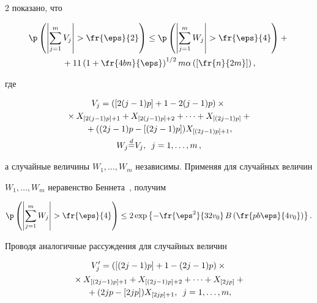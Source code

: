 \begin{multicols}{2}
показано, что

\begin{multline*}

\p \left(\left|\sum\limits_{j=1}^m V_j\right| > \fr{\eps}{2} \right) \leq 

\p \left(\left|\sum\limits_{j=1}^m W_j\right| > \fr{\eps}{4}\right) + {}\\

{}+

11\left(1+\fr{4bn}{\eps}\right)^{1/2} m 

\alpha\left(\left[\fr{n}{2m}\right]\right),

\end{multline*}

где

\begin{multline*}

V_j = ([2(j-1)p]+1-2(j-1)p)\times{}\\

{}\times X_{[2(j-1)p]+1}+X_{[2(j-1)p]+2}+\cdots + X_{[(2j-1)p]} + {}\\

{}+((2j-1)p-[(2j-1)p])X_{[(2j-1)p]+1},\\

  W_j {\overset{d}{=}} V_j, \enskip j = 1,\ldots,m\,,

  \end{multline*}

а случайные величины $W_1,\ldots,W_m$ независимы. Применяя для случайных величин 

$W_1,\ldots,W_m$ неравенство Беннета~\cite{Pollard}, получим

$$

\p \left(\left|\sum\limits_{j=1}^m W_j\right| > \fr{\eps}{4}\right) \leq 2 

\exp\left\{-\fr{\eps^2}{32 v_0}\, 

B\left(\fr{pb\eps}{4v_0}\right)\right\}.

$$

Проводя аналогичные рассуждения для случайных величин

\begin{multline*}

V'_j = ([(2j-1)p]+1-(2j-1)p) \times{}\\

{}\times X_{[(2j-1)p]+1}+X_{[(2j-1)p]+2}+\cdots + X_{[2jp]} +{}\\

{}+ (2jp-[2jp])X_{[2jp]+1}, \enskip j = 1,\ldots,m,


\end{multline*}
\end{multicols}
